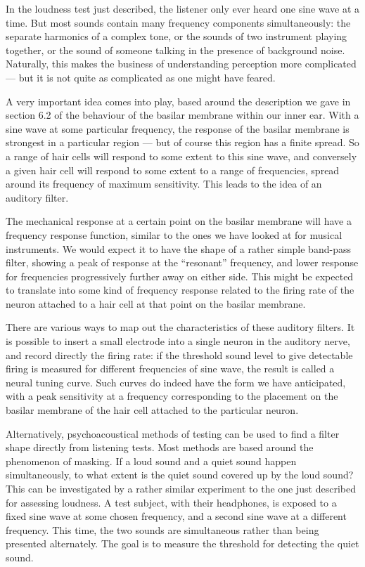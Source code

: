 

  In the loudness test just described, the listener only ever heard one sine 
  wave at a time. But most sounds contain many frequency components 
  simultaneously: the separate harmonics of a complex tone, or the sounds of 
  two instrument playing together, or the sound of someone talking in the 
  presence of background noise. Naturally, this makes the business of 
  understanding perception more complicated --- but it is not quite as 
  complicated as one might have feared. 

  A very important idea comes into play, based around the description we gave 
  in section 6.2 of the behaviour of the basilar membrane within our inner ear. 
  With a sine wave at some particular frequency, the response of the basilar 
  membrane is strongest in a particular region --- but of course this region 
  has a finite spread. So a range of hair cells will respond to some extent to 
  this sine wave, and conversely a given hair cell will respond to some extent 
  to a range of frequencies, spread around its frequency of maximum 
  sensitivity. This leads to the idea of an auditory filter. 

  The mechanical response at a certain point on the basilar membrane will have 
  a frequency response function, similar to the ones we have looked at for 
  musical instruments. We would expect it to have the shape of a rather simple 
  band-pass filter, showing a peak of response at the ``resonant'' frequency, 
  and lower response for frequencies progressively further away on either side. 
  This might be expected to translate into some kind of frequency response 
  related to the firing rate of the neuron attached to a hair cell at that 
  point on the basilar membrane. 

  There are various ways to map out the characteristics of these auditory 
  filters. It is possible to insert a small electrode into a single neuron in 
  the auditory nerve, and record directly the firing rate: if the threshold 
  sound level to give detectable firing is measured for different frequencies 
  of sine wave, the result is called a neural tuning curve. Such curves do 
  indeed have the form we have anticipated, with a peak sensitivity at a 
  frequency corresponding to the placement on the basilar membrane of the hair 
  cell attached to the particular neuron. 

  Alternatively, psychoacoustical methods of testing can be used to find a 
  filter shape directly from listening tests. Most methods are based around the 
  phenomenon of masking. If a loud sound and a quiet sound happen 
  simultaneously, to what extent is the quiet sound covered up by the loud 
  sound? This can be investigated by a rather similar experiment to the one 
  just described for assessing loudness. A test subject, with their headphones, 
  is exposed to a fixed sine wave at some chosen frequency, and a second sine 
  wave at a different frequency. This time, the two sounds are simultaneous 
  rather than being presented alternately. The goal is to measure the threshold 
  for detecting the quiet sound. 

